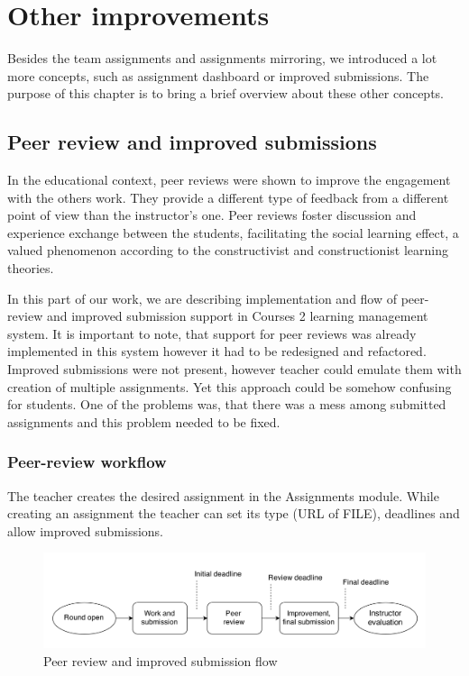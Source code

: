 \chapter{Other improvements}
\label{sec:other}
Besides the team assignments and assignments mirroring, we introduced a lot more concepts, such as assignment dashboard or improved submissions. The purpose of this chapter is to bring a brief overview about these other concepts.

\section{Peer review and improved submissions}

In the educational context, peer reviews were shown to improve the engagement with the others work. They provide a different type of feedback from a different point of view than the instructor’s one. Peer reviews foster discussion and experience exchange between the students, facilitating the social learning effect, a valued phenomenon according to the constructivist and constructionist learning theories. \cite{peerreview}

In this part of our work, we are describing implementation and flow of peer-review and improved submission support in Courses 2 learning management system. It is important to note, that support for peer reviews was already implemented in this system however it had to be redesigned and refactored. Improved submissions were not present, however teacher could emulate them with creation of multiple assignments. Yet this approach could be somehow confusing for students. One of the problems was, that there was a mess among submitted assignments and this problem needed to be fixed.


\subsection{Peer-review workflow}

The teacher creates the desired assignment in the Assignments module. While creating an assignment the teacher can set its type (URL of FILE), deadlines and allow improved submissions.

\begin{figure}[h]
    \centering
    \includegraphics[width=\textwidth]{images/peerreview.png}
    \caption{Peer review and improved submission flow}
    \label{fig:improved_submissions}
\end{figure}

